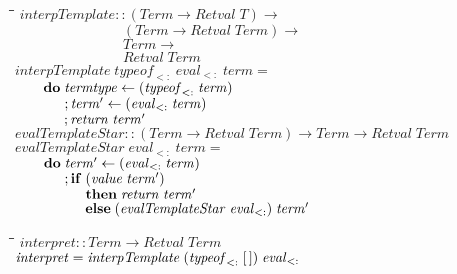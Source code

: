 \documentclass[10pt]{article}
\newlength{\lwidth}\setlength{\lwidth}{4.5cm}
\newlength{\cwidth}\setlength{\cwidth}{8mm} %
\newcommand{\Conid}[1]{\mathit{#1}}
\newcommand{\Varid}[1]{\mathit{#1}}
\begin{document}
\begin{tabbing}
\qquad\=\hspace{\lwidth}\=\hspace{\cwidth}\=\+\kill
${\Varid{interpTemplate}\mathbin{::}(\Conid{Term}\to \Conid{Retval}\;\Varid{T})\to }$\\
${\phantom{\Varid{interpTemplate}\mathbin{::}\mbox{}}(\Conid{Term}\to \Conid{Retval}\;\Conid{Term})\to }$\\
${\phantom{\Varid{interpTemplate}\mathbin{::}\mbox{}}\Conid{Term}\to }$\\
${\phantom{\Varid{interpTemplate}\mathbin{::}\mbox{}}\Conid{Retval}\;\Conid{Term}}$\\
${\Varid{interpTemplate}\;\Varid{typeof}_{<:}\;\Varid{eval}_{<:}\;\Varid{term}\mathrel{=}}$\\
${\hskip2.00em\relax\mathbf{do}\;\Varid{termtype}\leftarrow (\Varid{typeof}_{<:}\;\Varid{term})}$\\
${\hskip2.00em\relax\phantom{\mathbf{do}\;\mbox{}};\Varid{term'}\leftarrow (\Varid{eval}_{<:}\;\Varid{term})}$\\
${\hskip2.00em\relax\phantom{\mathbf{do}\;\mbox{}};\Varid{return}\;\Varid{term'}}$\\
${}$\\
${\Varid{evalTemplateStar}\mathbin{::}(\Conid{Term}\to \Conid{Retval}\;\Conid{Term})\to \Conid{Term}\to \Conid{Retval}\;\Conid{Term}}$\\
${\Varid{evalTemplateStar}\;\Varid{eval}_{<:}\;\Varid{term}\mathrel{=}}$\\
${\hskip2.00em\relax\mathbf{do}\;\Varid{term'}\leftarrow (\Varid{eval}_{<:}\;\Varid{term})}$\\
${\hskip2.00em\relax\phantom{\mathbf{do}\;\mbox{}};\mathbf{if}\;(\Varid{value}\;\Varid{term'})}$\\
${\hskip2.00em\relax\phantom{\mathbf{do}\;\mbox{}}\phantom{;\mathbf{if}\;\mbox{}}\mathbf{then}\;\Varid{return}\;\Varid{term'}}$\\
${\hskip2.00em\relax\phantom{\mathbf{do}\;\mbox{}}\phantom{;\mathbf{if}\;\mbox{}}\mathbf{else}\;(\Varid{evalTemplateStar}\;\Varid{eval}_{<:})\;\Varid{term'}}$
\end{tabbing}
\begin{tabbing}
\qquad\=\hspace{\lwidth}\=\hspace{\cwidth}\=\+\kill
${\Varid{interpret}\mathbin{::}\Conid{Term}\to \Conid{Retval}\;\Conid{Term}}$\\
${\Varid{interpret}\mathrel{=}\Varid{interpTemplate}\;(\Varid{typeof}_{<:}\;[\mskip1.5mu \mskip1.5mu])\;\Varid{eval}_{<:}}$
\end{tabbing}
\end{document}
